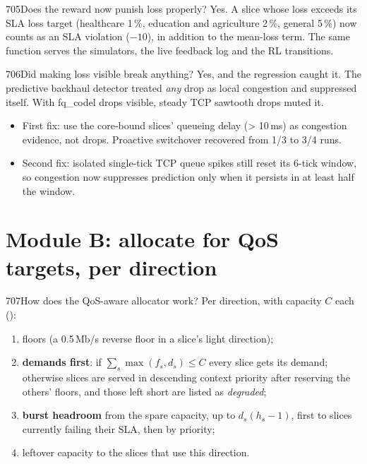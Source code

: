 \begin{qa}{705}{Does the reward now punish loss properly?}
Yes. A slice whose loss exceeds its SLA loss target (healthcare 1\,\%, education and agriculture 2\,\%, general 5\,\%)
now counts as an SLA violation ($-10$), in addition to the mean-loss term. The same function serves the simulators,
the live feedback log and the RL transitions.
\end{qa}

\begin{qa}{706}{Did making loss visible break anything?}
Yes, and the regression caught it. The predictive backhaul detector treated \emph{any} drop as local congestion and
suppressed itself. With fq\_codel drops visible, steady TCP sawtooth drops muted it.
\begin{itemize}
\item First fix: use the core-bound slices' queueing delay (> 10\,ms) as congestion evidence, not drops. Proactive
switchover recovered from 1/3 to 3/4 runs.
\item Second fix: isolated single-tick TCP queue spikes still reset its 6-tick window, so congestion now suppresses
prediction only when it persists in at least half the window.
\end{itemize}
\end{qa}

\section{Module B: allocate for QoS targets, per direction}

\begin{qa}{707}{How does the QoS-aware allocator work?}
Per direction, with capacity $C$ each ():
\begin{enumerate}
\item floors (a 0.5\,Mb/s reverse floor in a slice's light direction);
\item \textbf{demands first}: if $\sum_s\max(f_s,d_s)\le C$ every slice gets its demand; otherwise slices are served in
descending context priority after reserving the others' floors, and those left short are listed as \emph{degraded};
\item \textbf{burst headroom} from the spare capacity, up to $d_s(h_s-1)$, first to slices currently failing their
SLA, then by priority;
\item leftover capacity to the slices that use this direction.
\end{enumerate}
\end{qa}

